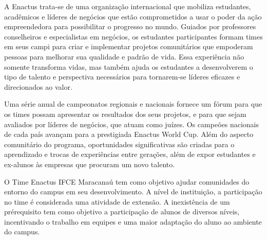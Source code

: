 \documentclass{paper}
\begin{document}
A Enactus trata-se de uma organização internacional que mobiliza estudantes, acadêmicos e líderes de negócios que estão comprometidos a usar o poder da ação empreendedora para possibilitar o progresso no mundo. Guiados por professores conselheiros e especialistas em negócios, os estudantes
participantes formam times em seus campi para criar e implementar projetos comunitários que empoderam pessoas para melhorar sua qualidade e padrão de vida. Essa experiência não somente transforma vidas, mas também ajuda os estudantes a desenvolverem o tipo de talento e perspectiva necessários para tornarem-se líderes eficazes e direcionados ao valor.

Uma série anual de campeonatos regionais e nacionais fornece um fórum para que os times possam apresentar os resultados dos seus projetos, e para que sejam avaliados por líderes de negócios, que atuam como juízes. Os campeões nacionais de cada país avançam para a prestigiada Enactus World Cup. Além do aspecto comunitário do programa, oportunidades significativas são criadas para o aprendizado e trocas de experiências entre gerações, além de expor estudantes e ex-alunos às empresas que procuram um novo talento.

O Time Enactus IFCE Maracanaú tem como objetivo ajudar comunidades do entorno do campus em seu desenvolvimento. A nível de instituição, a participação no time é considerada uma atividade de extensão. A inexistência de um prérequisito tem como objetivo a participação de alunos de diversos níveis, incentivando o trabalho em equipes e uma maior adaptação do aluno ao ambiente do campus.



\end{document}

